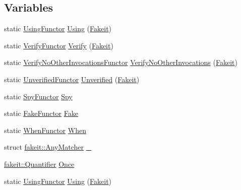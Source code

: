 \subsection*{Variables}
\begin{DoxyCompactItemize}
\item 
static \mbox{\hyperlink{classfakeit_1_1UsingFunctor}{Using\+Functor}} \mbox{\hyperlink{namespacefakeit_a9455b27545764b3433b1ecc507561870}{Using}} (\mbox{\hyperlink{single__header_2tpunit_2fakeit_8hpp_a2b1f324059bec9d07841630bd5c2e7bc}{Fakeit}})
\item 
static \mbox{\hyperlink{classfakeit_1_1VerifyFunctor}{Verify\+Functor}} \mbox{\hyperlink{namespacefakeit_a98461e1563bebcff90de1ab7871edfef}{Verify}} (\mbox{\hyperlink{single__header_2tpunit_2fakeit_8hpp_a2b1f324059bec9d07841630bd5c2e7bc}{Fakeit}})
\item 
static \mbox{\hyperlink{classfakeit_1_1VerifyNoOtherInvocationsFunctor}{Verify\+No\+Other\+Invocations\+Functor}} \mbox{\hyperlink{namespacefakeit_a1fdaffe6f7ef1789d8ef832cc4cc19c3}{Verify\+No\+Other\+Invocations}} (\mbox{\hyperlink{single__header_2tpunit_2fakeit_8hpp_a2b1f324059bec9d07841630bd5c2e7bc}{Fakeit}})
\item 
static \mbox{\hyperlink{classfakeit_1_1UnverifiedFunctor}{Unverified\+Functor}} \mbox{\hyperlink{namespacefakeit_aeaed1b328c76d8460e403a1a0d22eb96}{Unverified}} (\mbox{\hyperlink{single__header_2tpunit_2fakeit_8hpp_a2b1f324059bec9d07841630bd5c2e7bc}{Fakeit}})
\item 
static \mbox{\hyperlink{classfakeit_1_1SpyFunctor}{Spy\+Functor}} \mbox{\hyperlink{namespacefakeit_a540f23d3c59c17f86dd99f0a8d845496}{Spy}}
\item 
static \mbox{\hyperlink{classfakeit_1_1FakeFunctor}{Fake\+Functor}} \mbox{\hyperlink{namespacefakeit_a8162a4e2e05662a6ce810ae0b9a7f89e}{Fake}}
\item 
static \mbox{\hyperlink{classfakeit_1_1WhenFunctor}{When\+Functor}} \mbox{\hyperlink{namespacefakeit_ac9c6dd7971865edcc46e075d6408b1bb}{When}}
\item 
struct \mbox{\hyperlink{structfakeit_1_1AnyMatcher}{fakeit\+::\+Any\+Matcher}} \mbox{\hyperlink{namespacefakeit_ab25a4592bc99cfb5347f30b2997d1187}{\+\_\+}}
\item 
\mbox{\hyperlink{structfakeit_1_1Quantifier}{fakeit\+::\+Quantifier}} \mbox{\hyperlink{namespacefakeit_a0ecd131a0536542ed5c33f6516589d8b}{Once}}
\item 
static \mbox{\hyperlink{classfakeit_1_1UsingFunctor}{Using\+Functor}} \mbox{\hyperlink{namespacefakeit_a9455b27545764b3433b1ecc507561870}{Using}} (\mbox{\hyperlink{single__header_2tpunit_2fakeit_8hpp_a2b1f324059bec9d07841630bd5c2e7bc}{Fakeit}})

\end{DoxyCompactItemize}
